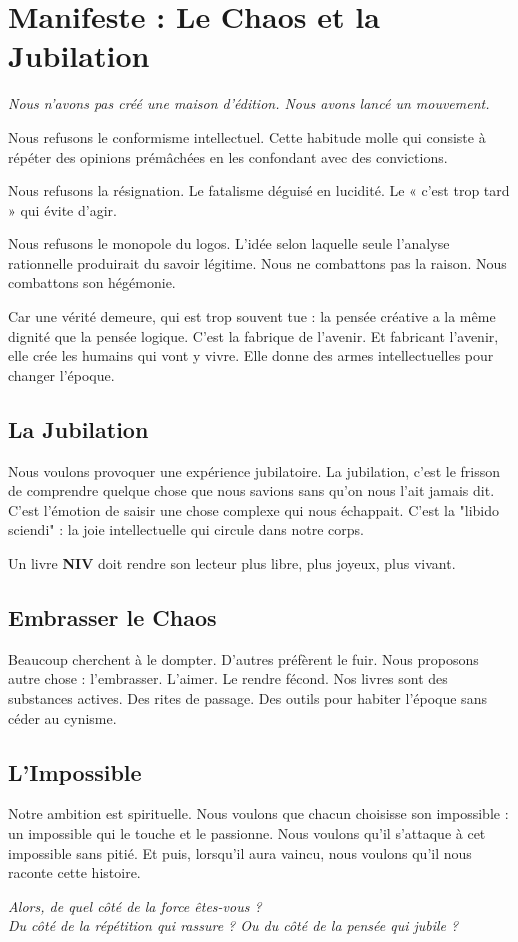 \chapter*{Manifeste : Le Chaos et la Jubilation}

\textit{Nous n’avons pas créé une maison d’édition. Nous avons lancé un mouvement.}

\vspace{1cm}

Nous refusons le conformisme intellectuel. Cette habitude molle qui consiste à répéter des opinions prémâchées en les confondant avec des convictions.

Nous refusons la résignation. Le fatalisme déguisé en lucidité. Le « c’est trop tard » qui évite d’agir.

Nous refusons le monopole du logos. L’idée selon laquelle seule l’analyse rationnelle produirait du savoir légitime. Nous ne combattons pas la raison. Nous combattons son hégémonie.

Car une vérité demeure, qui est trop souvent tue : la pensée créative a la même dignité que la pensée logique. C'est la fabrique de l'avenir. Et fabricant l'avenir, elle crée les humains qui vont y vivre. Elle donne des armes intellectuelles pour changer l'époque.

\section*{La Jubilation}
Nous voulons provoquer une expérience jubilatoire. La jubilation, c’est le frisson de comprendre quelque chose que nous savions sans qu'on nous l'ait jamais dit. C'est l'émotion de saisir une chose complexe qui nous échappait. C'est la "libido sciendi" : la joie intellectuelle qui circule dans notre corps.

Un livre \textbf{NIV} doit rendre son lecteur plus libre, plus joyeux, plus vivant.

\section*{Embrasser le Chaos}
Beaucoup cherchent à le dompter. D’autres préfèrent le fuir. Nous proposons autre chose : l’embrasser. L’aimer. Le rendre fécond. Nos livres sont des substances actives. Des rites de passage. Des outils pour habiter l’époque sans céder au cynisme.

\section*{L'Impossible}
Notre ambition est spirituelle. Nous voulons que chacun choisisse son impossible : un impossible qui le touche et le passionne. Nous voulons qu'il s'attaque à cet impossible sans pitié. Et puis, lorsqu'il aura vaincu, nous voulons qu'il nous raconte cette histoire.

\vspace{1.5cm}

\begin{center}
\textit{Alors, de quel côté de la force êtes-vous ? \\
Du côté de la répétition qui rassure ? Ou du côté de la pensée qui jubile ?}
\end{center}
